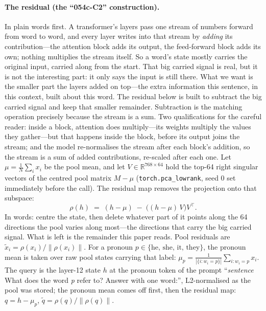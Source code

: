 \documentclass[11pt]{article}
\begin{document}
\paragraph{The residual (the ``054c-C2'' construction).} In plain
words first. A transformer's layers pass one stream of numbers
forward from word to word, and every layer writes into that stream
by \emph{adding} its contribution---the attention block adds its
output, the feed-forward block adds its own; nothing multiplies the
stream itself. So a word's state mostly carries the original input,
carried along from the start. That big carried signal is real, but
it is not the interesting part: it only says the input is still
there. What we want is the smaller part the layers added on
top---the extra information this sentence, in this context, built
about this word. The residual below is built to subtract the big
carried signal and keep that smaller remainder. Subtraction is the matching operation precisely because the stream is a sum. Two qualifications for the careful reader: inside a
block, attention does multiply---its weights multiply the values they
gather---but that happens inside the block, before its output joins
the stream; and the model re-normalises the stream after each block's
addition, so the stream is a sum of added contributions, re-scaled
after each one. Let
$\mu = \frac{1}{N}\sum_i x_i$ be the pool mean, and let
$V \in \mathbb{R}^{768 \times 64}$ hold the top-64 right singular
vectors of the centred pool matrix $M - \mu$
(\texttt{torch.pca\_lowrank}, seed 0 set immediately before the
call). The residual map removes the projection onto that subspace:
\begin{equation}
\rho(h) \;=\; (h - \mu) \;-\; \big((h - \mu)\, V\big) V^{\top}.
\label{eq:residual}
\end{equation}
In words: centre the state, then delete whatever part of it points
along the 64 directions the pool varies along most---the directions
that carry the big carried signal. What is left is the remainder
this paper reads.
Pool residuals are $\tilde{x}_i = \rho(x_i) / \lVert \rho(x_i) \rVert$.
For a pronoun $p \in \{\text{he, she, it, they}\}$, the pronoun mean
is taken over raw pool states carrying that label:
$\mu_p = \frac{1}{|\{i : w_i = p\}|} \sum_{i : w_i = p} x_i$.
The query is the layer-12 state $h$ at the pronoun token of the
prompt ``\emph{sentence} What does the word \emph{p} refer to?
Answer with one word:'', L2-normalised as the pool was stored; the
pronoun mean comes off first, then the residual map:
$q = h - \mu_p$, $\tilde{q} = \rho(q) / \lVert \rho(q) \rVert$.
\end{document}

